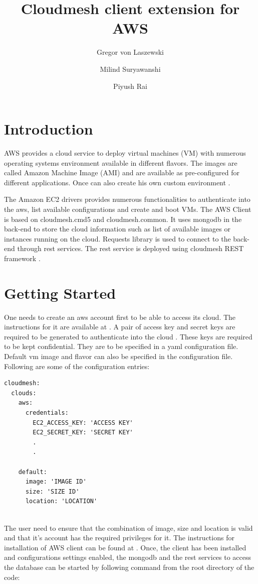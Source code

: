 \documentclass[9pt,twocolumn,twoside]{../../styles/osajnl}
\title{Cloudmesh client extension for AWS}
\author[1]{Gregor von Laszewski}
\author[1]{Milind Suryawanshi}
\author[1]{Piyush Rai}
\affil[1]{School of Informatics and Computing, Bloomington, IN 47408, U.S.A.}
\begin{document}
\maketitle

\section{Introduction}

AWS provides a cloud service to deploy virtual machines (VM) with numerous operating systems environment available in different flavors. The images are called Amazon Machine Image (AMI) and are available as pre-configured for different applications. Once can also create his own custom environment \cite{www-amazon-ec2}.

The Amazon EC2 drivers provides numerous functionalities to authenticate into the aws, list available configurations and create and boot VMs. The AWS Client is based on cloudmesh.cmd5 and cloudmesh.common. It uses mongodb in the back-end to store the cloud information such as list of available images or instances running on the cloud. Requests library \cite{www-python-requests} is used to connect to the back-end through rest services. The rest service is deployed using  cloudmesh REST framework \cite{www-cloudmesh-rest}.

\section{Getting Started}

One needs to create an aws account first to be able to access its cloud. The instructions for it are available at \cite{www-amazon-aws}. A pair of access key and secret keys are required to be generated to authenticate into the cloud \cite{www-amazon-key}. These keys are required to be kept confidential. They are to be specified in a yaml configuration file. Default vm image and flavor can also be specified in the configuration file. Following are some of the configuration entries:

\begin{verbatim} 
cloudmesh:
  clouds:
    aws:
      credentials:
        EC2_ACCESS_KEY: 'ACCESS KEY'
        EC2_SECRET_KEY: 'SECRET KEY'
        .
        .

    default:
      image: 'IMAGE ID'
      size: 'SIZE ID'
      location: 'LOCATION'
	  
\end{verbatim}

The user need to ensure that the combination of image, size and location is valid and that it's account has the required privileges for it. The instructions for installation of AWS client can be found at \cite{www-cloudmesh-aws}. Once, the client has been installed and configurations settings enabled, the mongodb and the rest services to access the database can be started by following command from the root directory of the code:
\end{document}
